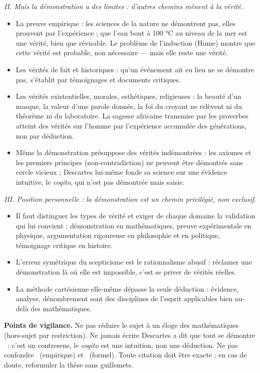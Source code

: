 \documentclass[11pt]{article}
\newcommand{\cle}[1]{{\popxbold\color{popdark}#1}}
\begin{document}
\begin{corrige}
\emph{II. Mais la démonstration a des \cle{limites} : d'autres chemins mènent à la vérité.}
\begin{itemize}
\item La \cle{preuve empirique} : les sciences de la nature ne démontrent pas, elles prouvent par l'expérience ; que l'eau bout à 100 °C au niveau de la mer est une vérité, bien que \cle{révisable}. Le problème de l'induction (Hume) montre que cette vérité est \cle{probable}, non nécessaire — mais elle reste une vérité.
\item Les \cle{vérités de fait} et \cle{historiques} : qu'un événement ait eu lieu ne se démontre pas, s'établit par \cle{témoignages} et \cle{documents critiques}.
\item Les \cle{vérités existentielles, morales, esthétiques, religieuses} : la beauté d'un masque, la valeur d'une parole donnée, la foi du croyant ne relèvent ni du théorème ni du laboratoire. La \cle{sagesse africaine} transmise par les proverbes atteint des vérités sur l'homme par l'expérience accumulée des générations, non par déduction.
\item Même la démonstration \cle{présuppose} des vérités indémontrées : les \cle{axiomes} et les \cle{premiers principes} (non-contradiction) ne peuvent être démontrés sans cercle vicieux ; Descartes lui-même fonde sa science sur une \cle{évidence intuitive}, le \emph{cogito}, qui n'est pas démontrée mais \cle{saisie}.
\end{itemize}

\emph{III. Position personnelle : la démonstration est un chemin \cle{privilégié}, non \cle{exclusif}.}
\begin{itemize}
\item Il faut \cle{distinguer les types de vérité} et exiger de chaque domaine la validation qui lui convient : démonstration en mathématiques, preuve expérimentale en physique, argumentation rigoureuse en philosophie et en politique, témoignage critique en histoire.
\item L'erreur symétrique du scepticisme est le \cle{rationnalisme abusif} : réclamer une démonstration là où elle est impossible, c'est se priver de vérités réelles.
\item La \cle{méthode cartésienne} elle-même dépasse la seule déduction : évidence, analyse, dénombrement sont des disciplines de l'esprit applicables bien au-delà des mathématiques.
\end{itemize}

\textbf{Points de vigilance.} Ne pas réduire le sujet à un éloge des mathématiques (hors-sujet par restriction). Ne jamais écrire \guillemotleft Descartes a dit que tout se démontre \guillemotright\ : c'est un \cle{contresens}, le \emph{cogito} est une \cle{intuition}, non une déduction. Ne pas confondre \guillemotleft \cle{prouver} \guillemotright\ (empirique) et \guillemotleft \cle{démontrer} \guillemotright\ (formel). Toute citation doit être exacte ; en cas de doute, reformuler la thèse sans guillemets.
\end{corrige}
\end{document}
